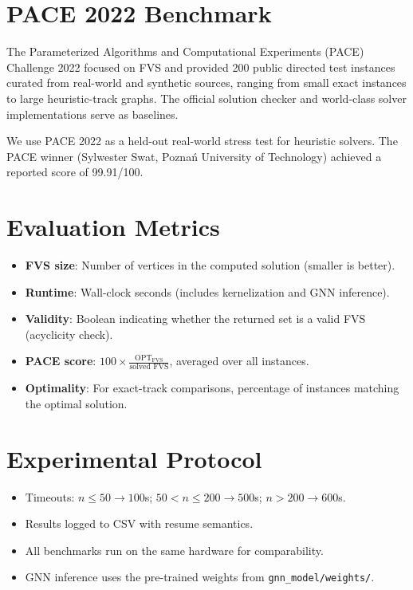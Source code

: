 \documentclass[10pt,a4paper]{report}
\theoremstyle{definition}
\newcommand{\OPT}{\mathrm{OPT}}
\begin{document}
\section{PACE 2022 Benchmark}

The Parameterized Algorithms and Computational Experiments (PACE) Challenge 2022 \cite{grossmann2022ipec} focused on FVS and provided 200 public directed test instances curated from real-world and synthetic sources, ranging from small exact instances to large heuristic-track graphs. The official solution checker and world-class solver implementations serve as baselines.

We use PACE 2022 as a held-out real-world stress test for heuristic solvers. The PACE winner (Sylwester Swat, Pozna\'{n} University of Technology) achieved a reported score of 99.91/100.

\section{Evaluation Metrics}

\begin{itemize}
	\item \textbf{FVS size}: Number of vertices in the computed solution (smaller is better).
	\item \textbf{Runtime}: Wall-clock seconds (includes kernelization and GNN inference).
	\item \textbf{Validity}: Boolean indicating whether the returned set is a valid FVS (acyclicity check).
	\item \textbf{PACE score}: $100 \times \frac{\OPT_{\text{FVS}}}{\text{solved FVS}}$, averaged over all instances.
	\item \textbf{Optimality}: For exact-track comparisons, percentage of instances matching the optimal solution.
\end{itemize}

\section{Experimental Protocol}

\begin{itemize}
	\item Timeouts: $n \leq 50 \to 100$s; $50 < n \leq 200 \to 500$s; $n > 200 \to 600$s.
	\item Results logged to CSV with resume semantics.
	\item All benchmarks run on the same hardware for comparability.
	\item GNN inference uses the pre-trained weights from \texttt{gnn\_model/weights/}.
\end{itemize}
\end{document}
